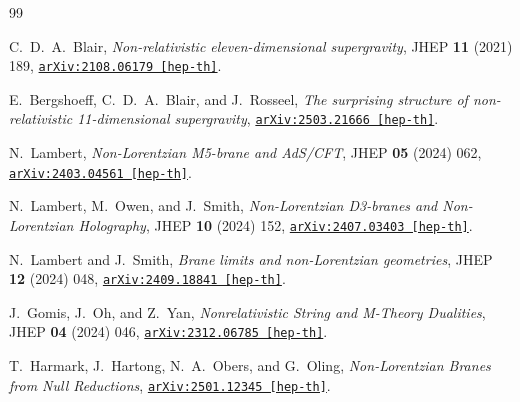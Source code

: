 \documentclass[11pt,a4paper]{article}
\begin{document}
\begin{thebibliography}{99}\small
\setlength{\itemsep}{0.1em}
\setlength{\parskip}{0pt}

C.~D.~A.~Blair,
\emph{Non-relativistic eleven-dimensional supergravity},
JHEP \textbf{11} (2021) 189,
\href{https://arxiv.org/abs/2108.06179}{\texttt{arXiv:2108.06179 [hep-th]}}.

E.~Bergshoeff, C.~D.~A.~Blair, and J.~Rosseel,
\emph{The surprising structure of non-relativistic 11-dimensional supergravity},
\href{https://arxiv.org/abs/2503.21666}{\texttt{arXiv:2503.21666 [hep-th]}}.

N.~Lambert,
\emph{Non-Lorentzian M5-brane and AdS/CFT},
JHEP \textbf{05} (2024) 062,
\href{https://arxiv.org/abs/2403.04561}{\texttt{arXiv:2403.04561 [hep-th]}}.

N.~Lambert, M.~Owen, and J.~Smith,
\emph{Non-Lorentzian D3-branes and Non-Lorentzian Holography},
JHEP \textbf{10} (2024) 152,
\href{https://arxiv.org/abs/2407.03403}{\texttt{arXiv:2407.03403 [hep-th]}}.

N.~Lambert and J.~Smith,
\emph{Brane limits and non-Lorentzian geometries},
JHEP \textbf{12} (2024) 048,
\href{https://arxiv.org/abs/2409.18841}{\texttt{arXiv:2409.18841 [hep-th]}}.

J.~Gomis, J.~Oh, and Z.~Yan,
\emph{Nonrelativistic String and M-Theory Dualities},
JHEP \textbf{04} (2024) 046,
\href{https://arxiv.org/abs/2312.06785}{\texttt{arXiv:2312.06785 [hep-th]}}.

T.~Harmark, J.~Hartong, N.~A.~Obers, and G.~Oling,
\emph{Non-Lorentzian Branes from Null Reductions},
\href{https://arxiv.org/abs/2501.12345}{\texttt{arXiv:2501.12345 [hep-th]}}.

\end{thebibliography}
\end{document}
